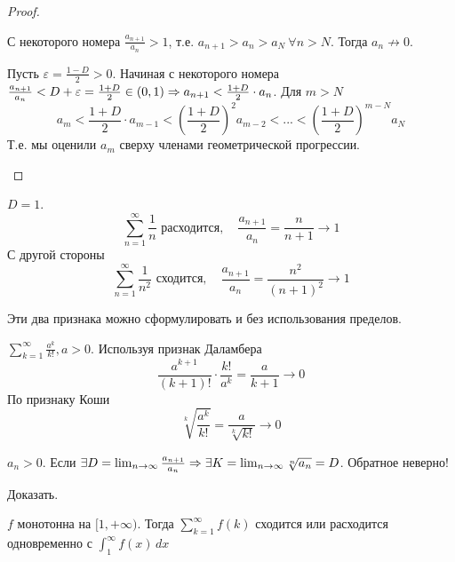 \begin{proof}
	\begin{MyList}
		\item С некоторого номера $ \frac{a_{n + 1}}{a_n} > 1$, т.е. $a_{n + 1} > a_n > a_N \ \forall n > N$.
		Тогда $a_n \not\to 0$.

		\item Пусть $\varepsilon = \frac{1 - D}{2} > 0$. Начиная с некоторого номера $ \frac{a_{n + 1}}{a_n} < D + \varepsilon = \frac{1 + D}{2} \in (0, 1) \Rightarrow a_{n + 1} < \frac{1 + D}{2} \cdot a_n$. Для $m > N$ 
		\[a_m < \frac{1 + D}{2} \cdot a_{m - 1} < \left( \frac{1 + D}{2}\right)^2 a_{m - 2} < ... < \left( \frac{1 + D}{2}\right)^{m - N} a_N\]
		Т.е. мы оценили $a_m$ сверху членами геометрической прогрессии.
	\end{MyList}
\end{proof}

\begin{Rem}
	$D = 1$.
	\[\sum_{n=1}^{\infty} \frac{1}{n} \text{ расходится}, \quad \frac{a_{n + 1}}{a_n} = \frac{n}{n + 1} \to 1\]
	С другой стороны
	\[\sum_{n=1}^{\infty} \frac{1}{n^2} \text{ сходится}, \quad \frac{a_{n + 1}}{a_n} = \frac{n^2}{(n + 1)^2} \to 1\] 
\end{Rem}

\begin{Rem}
	Эти два признака можно сформулировать и без использования пределов.
\end{Rem}

\begin{Example}
	$\sum_{k=1}^{\infty} \frac{a^k}{k!}, a > 0$. Используя признак Даламбера
	\[ \frac{a^{k + 1}}{(k + 1)!} \cdot \frac{k!}{a^k} = \frac{a}{k + 1} \to 0\] 
	По признаку Коши
	\[\sqrt[k]{ \frac{a^k}{k!}} = \frac{a}{\sqrt[k]{k!}} \to 0\] 
\end{Example}

\begin{Rem}
	$a_n > 0$. Если $\exists D = \lim_{n \to \infty} \frac{a_{n + 1}}{a_n} \Rightarrow \exists K = \lim_{n \to \infty} \sqrt[n]{a_n} = D$.
	Обратное неверно!
\end{Rem}

\begin{Ex}
	Доказать.
\end{Ex}

\begin{Thm}
	$f$ монотонна на $[1, +\infty)$. Тогда
	$\sum_{k=1}^{\infty} f(k)$ сходится или расходится одновременно с $\int_1^\infty f(x)\,dx$ 
\end{Thm}

